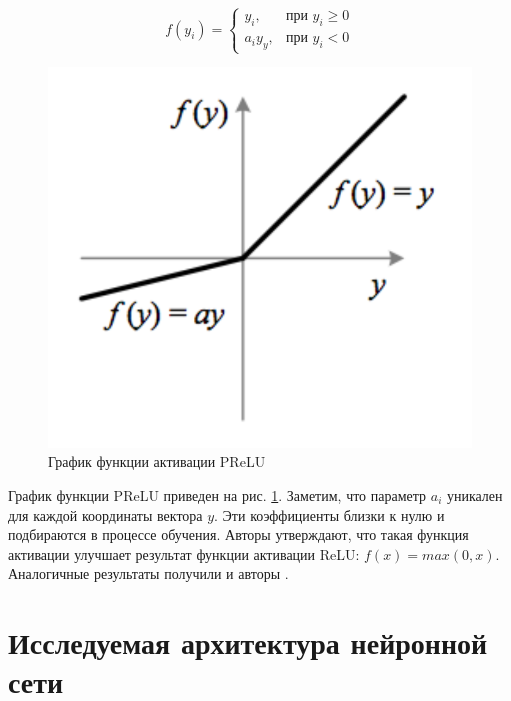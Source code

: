 \documentclass[14pt, a4paper]{extarticle}
\begin{document}
\begin{equation*}
	f(y_i) = \begin{cases}
		y_i, & \text{при $y_i \geq 0$} \\
		a_iy_y, & \text{при $y_i < 0$}
	\end{cases}
\end{equation*}

\begin{figure}[h]
\begin{center}
	\includegraphics[scale=0.4]{images/prelu.png}
\end{center}
	\caption{График функции активации PReLU}
	\label{figure:prelu}
\end{figure}

График функции PReLU приведен на рис. \ref{figure:prelu}. Заметим, что параметр $a_i$ уникален для каждой координаты вектора $y$. Эти коэффициенты близки к нулю и подбираются в процессе обучения. 
Авторы утверждают, что такая функция активации улучшает результат функции активации ReLU: $f(x) = max(0, x)$. Аналогичные результаты получили и авторы \cite{prelu_experiment}.

\newpage

\newpage
\section{Исследуемая архитектура нейронной сети}
\label{paragraph:method}
 
\end{document}
